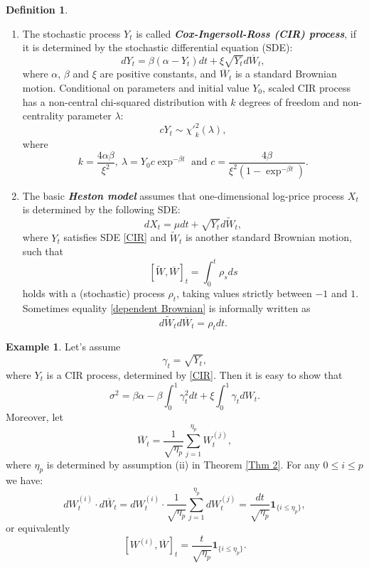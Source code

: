 \documentclass[a4paper,11pt]{article}
\theoremstyle{plain}
\theoremstyle{definition}
\newtheorem{defn}[thm]{Definition}
\newtheorem{exmp}[thm]{Example}
\newcommand{\define}[1]{\textit{\textbf{#1}}}
\begin{document}
    \begin{defn} \
    	\begin{enumerate}
    		\item 
    		The stochastic process $Y_t$ is called \define{Cox-Ingersoll-Ross (CIR) process}, if it is determined by the stochastic differential equation (SDE):
    		\begin{equation} \label{CIR}
    		    dY_t = \beta(\alpha - Y_t)dt + \xi\sqrt{Y_t}d \overline{W}_t,
    		\end{equation}
    		where $\alpha$, $\beta$ and $\xi$ are positive constants, and $\overline{W}_t$ is a standard Brownian motion. Conditional on parameters and initial value $Y_0$, scaled CIR process has a non-central chi-squared distribution with $k$ degrees of freedom and non-centrality parameter $\lambda$:
    		\[ c Y_t \sim {\chi'}_k^2(\lambda),  \]
    		where
    		\[k = \frac{4\alpha \beta}{\xi^2},\ \lambda = Y_0 c \exp^{-\beta t} \text{ and } c = \frac{4 \beta}{\xi^2 (1-\exp^{-\beta t})}.\]
    		\item The basic \define{Heston model} assumes that one-dimensional log-price process $X_t$ is determined by the following SDE:
    		\begin{equation} 
    		dX_t = \mu dt + \sqrt{Y_t}d\widetilde{W}_t,
    		\end{equation}
    		where $Y_t$ satisfies SDE \eqref{CIR} and $\widetilde{W}_t$ is another standard Brownian motion, such that 
    		\begin{equation} \label{dependent Brownian}
    		[\widetilde{W}, \overline{W}]_t = \int_{0}^{t}\rho_s ds
    		\end{equation}
    		holds with a (stochastic) process $\rho_t$, taking values strictly between $-1$ and $1$. Sometimes equality \eqref{dependent Brownian} is informally written as
    		\[ d\widetilde{W}_td\overline{W}_t = \rho_t dt. \]
    	\end{enumerate}
    \end{defn}
    
    \begin{exmp} \label{SimCIR}
    	Let's assume
    	\[ \gamma_t = \sqrt{Y_t}, \]
    	where $Y_t$ is a CIR process, determined by \eqref{CIR}. Then it is easy to show that
    	\[ \sigma^2 = \beta\alpha - \beta\int_{0}^{1} \gamma_t^2dt + \xi \int_{0}^{1} \gamma_t dW_t.\]
    	Moreover, let
    	\[ \overline{W}_t = \frac{1}{\sqrt{\eta_p}} \sum_{j=1}^{\eta_p}W_t^{(j)}, \]
    	where $\eta_p$ is determined by assumption (ii) in Theorem \ref{Thm 2}.
    	For any $0 \leq i \leq p$ we have:
    	\[ dW_t^{(i)}\cdot d\overline{W}_t = dW_t^{(i)} \cdot \frac{1}{\sqrt{\eta_p}} \sum_{j=1}^{\eta_p}dW_t^{(j)} = \frac{dt}{\sqrt{\eta_p}} \mathbf{1}_{\{i \leq \eta_p\}}, \]
    	or equivalently 
    	\[ [W^{(i)}, \overline{W}]_t =  \frac{t}{\sqrt{\eta_p}} \mathbf{1}_{\{i \leq \eta_p\}}.  \]
    \end{exmp}
    
\end{document}

